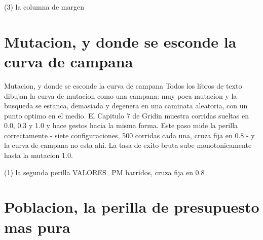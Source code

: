 \begin{frame}[fragile]{(3) la columna de margen}

\end{frame}


\section{Mutacion, y donde se esconde la curva de campana}

\begin{frame}{Mutacion, y donde se esconde la curva de campana}
Todos los libros de texto dibujan la curva de mutacion como una campana: muy poca mutacion y
la busqueda se estanca, demasiada y degenera en una caminata aleatoria, con un
punto optimo en el medio. El Capitulo 7 de Gridin muestra corridas sueltas en 0.0, 0.3 y
1.0 y hace gestos hacia la misma forma. Este paso mide la perilla correctamente -
siete configuraciones, 500 corridas cada una, cruza fija en 0.8 - y la curva de campana
no esta ahi. La tasa de exito bruta sube monotonicamente hasta
la mutacion 1.0.
\end{frame}

\begin{frame}[fragile]{(1) la segunda perilla VALORES\_PM barridos, cruza fija en 0.8}

\end{frame}


\section{Poblacion, la perilla de presupuesto mas pura}

